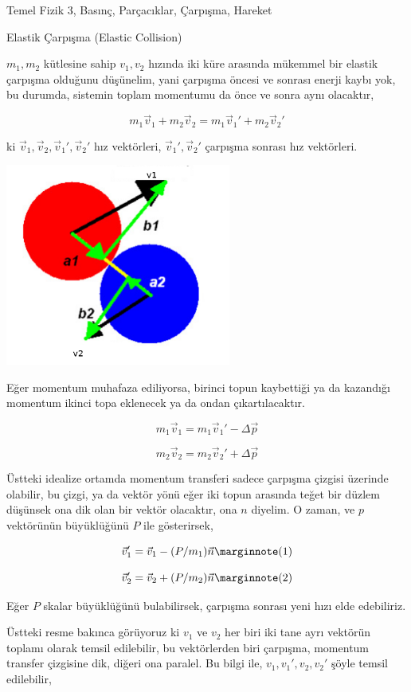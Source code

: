 \documentclass[12pt,fleqn]{article}\usepackage{../../common}
\begin{document}
Temel Fizik 3, Basınç, Parçacıklar, Çarpışma, Hareket

Elastik Çarpışma (Elastic Collision)

$m_1,m_2$ kütlesine sahip $v_1,v_2$ hızında iki küre arasında mükemmel bir
elastik çarpışma olduğunu düşünelim, yani çarpışma öncesi ve sonrası enerji
kaybı yok, bu durumda, sistemin toplam momentumu da önce ve sonra aynı
olacaktır, 

$$
m_1 \vec{v}_1 + m_2 \vec{v}_2 = m_1 \vec{v}_1' + m_2 \vec{v}_2' 
$$

ki $\vec{v}_1,\vec{v}_2,\vec{v}_1',\vec{v}_2'$ hız vektörleri,
$\vec{v}_1',\vec{v}_2'$ çarpışma sonrası hız vektörleri.

\includegraphics[width=20em]{phy_005_basics_06.png}

Eğer momentum muhafaza ediliyorsa, birinci topun kaybettiği ya da kazandığı
momentum ikinci topa eklenecek ya da ondan çıkartılacaktır.

$$
m_1 \vec{v}_1 = m_1 \vec{v}_1' - \Delta \vec{p}
$$

$$
m_2 \vec{v}_2 = m_2 \vec{v}_2' + \Delta \vec{p}
$$

Üstteki idealize ortamda momentum transferi sadece çarpışma çizgisi üzerinde
olabilir, bu çizgi, ya da vektör yönü eğer iki topun arasında teğet bir düzlem
düşünsek ona dik olan bir vektör olacaktır, ona $n$ diyelim. O zaman, ve $p$
vektörünün büyüklüğünü $P$ ile gösterirsek,

$$
\vec{v}_1' = \vec{v}_1 - (P / m_1) \vec{n}
\mlabel{1}
$$

$$
\vec{v}_2' = \vec{v}_2 + (P / m_2) \vec{n}
\mlabel{2}
$$

Eğer $P$ skalar büyüklüğünü bulabilirsek, çarpışma sonrası yeni hızı elde
edebiliriz. 

Üstteki resme bakınca görüyoruz ki $v_1$ ve $v_2$ her biri iki tane ayrı
vektörün toplamı olarak temsil edilebilir, bu vektörlerden biri çarpışma,
momentum transfer çizgisine dik, diğeri ona paralel. Bu bilgi ile,
$v_1,v_1',v_2,v_2'$ şöyle temsil edilebilir,
\end{document}
